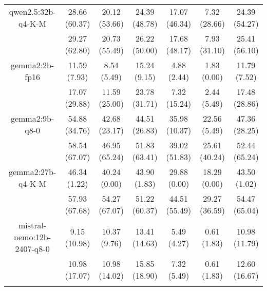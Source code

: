 \begin{table}[]
{\begin{tabular}{ccccccc}
        \multicolumn{1}{c|}{qwen2.5:32b-q4-K-M} & 28.66 (60.37) & 20.12 (53.66) & \multicolumn{1}{c|}{24.39 (48.78)} & 17.07 (46.34) & \multicolumn{1}{c|}{7.32 (28.66)} & 24.39 (54.27) \\
        
        

        \multicolumn{1}{c|}{} & 29.27 (62.80) & 20.73 (55.49) & \multicolumn{1}{c|}{26.22 (50.00)} & 17.68 (48.17) & \multicolumn{1}{c|}{7.93 (31.10)} & 25.41 (56.10) \\
        \cline{1-7}
        

        \multicolumn{1}{c|}{gemma2:2b-fp16} & 11.59 (7.93) & 8.54 (5.49) & \multicolumn{1}{c|}{15.24 (9.15)} & 4.88 (2.44) & \multicolumn{1}{c|}{1.83 (0.00)} & 11.79 (7.52) \\
        
        

        \multicolumn{1}{c|}{} & 17.07 (29.88) & 11.59 (25.00) & \multicolumn{1}{c|}{23.78 (31.71)} & 7.32 (15.24) & \multicolumn{1}{c|}{2.44 (5.49)} & 17.48 (28.86) \\
        \cline{1-7}
        

        \multicolumn{1}{c|}{gemma2:9b-q8-0} & 54.88 (34.76) & 42.68 (23.17) & \multicolumn{1}{c|}{44.51 (26.83)} & 35.98 (10.37) & \multicolumn{1}{c|}{22.56 (5.49)} & 47.36 (28.25) \\
        
        

        \multicolumn{1}{c|}{} & 58.54 (67.07) & 46.95 (65.24) & \multicolumn{1}{c|}{51.83 (63.41)} & 39.02 (51.83) & \multicolumn{1}{c|}{25.61 (40.24)} & 52.44 (65.24) \\
        \cline{1-7}
        

        \multicolumn{1}{c|}{gemma2:27b-q4-K-M} & 46.34 (1.22) & 40.24 (0.00) & \multicolumn{1}{c|}{43.90 (1.83)} & 29.88 (0.00) & \multicolumn{1}{c|}{18.29 (0.00)} & 43.50 (1.02) \\
        
        

        \multicolumn{1}{c|}{} & 57.93 (67.68) & 54.27 (67.07) & \multicolumn{1}{c|}{51.22 (60.37)} & 44.51 (55.49) & \multicolumn{1}{c|}{29.27 (36.59)} & 54.47 (65.04) \\
        \cline{1-7}
        

        \multicolumn{1}{c|}{mistral-nemo:12b-2407-q8-0} & 9.15 (10.98) & 10.37 (9.76) & \multicolumn{1}{c|}{13.41 (14.63)} & 5.49 (4.27) & \multicolumn{1}{c|}{0.61 (1.83)} & 10.98 (11.79) \\
        
        

        \multicolumn{1}{c|}{} & 10.98 (17.07) & 10.98 (14.02) & \multicolumn{1}{c|}{15.85 (18.90)} & 7.32 (5.49) & \multicolumn{1}{c|}{0.61 (1.83)} & 12.60 (16.67) \\
        \cline{1-7}
        
\\ \hline
\end{tabular}%
}
\end{table}
    
